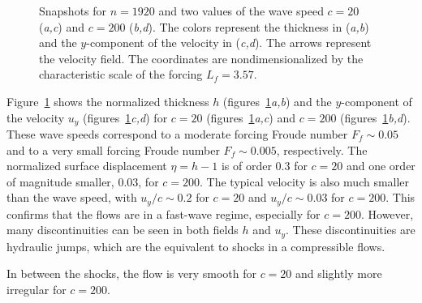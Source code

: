 \begin{figure}
\setlength{\halfwidth}{2.72in}
\caption{
Snapshots for $n = 1920$ and two values of the wave speed 
$c= 20$ (\textit{a,c}) and $c= 200$ (\textit{b,d}).
The colors represent the thickness in (\textit{a,b}) and
the $y$-component of the velocity in (\textit{c,d}).
The arrows represent the velocity field.
%
The coordinates are nondimensionalized by the characteristic scale of
the forcing $L_f = 3.57$.  }
\label{fig_phys}
\end{figure}

Figure~\ref{fig_phys} shows %
the normalized thickness $h$ %
(figures~\ref{fig_phys}\textit{a,b}) %
and the $y$-component of the velocity $u_y$ %
(figures~\ref{fig_phys}\textit{c,d}) %
for $c = 20$ (figures~\ref{fig_phys}\textit{a,c}) and %
$c = 200$ (figures~\ref{fig_phys}\textit{b,d}).
%
These wave speeds correspond %
to a moderate forcing Froude number $F_f \sim 0.05$ and %
to a very small forcing Froude number $F_f \sim 0.005$, respectively.
The normalized surface displacement $\eta = h - 1$ is of order 0.3 for
$c = 20$ and one order of magnitude smaller, 0.03, for $c = 200$.
%
The typical velocity is also much smaller than the wave speed, %
with $u_y/c \sim 0.2$ for $c = 20$ %
and $u_y/c \sim 0.03$ for $c = 200$. %
This confirms that the flows are in a fast-wave regime, especially for
$c = 200$.
%
However, many discontinuities can be seen in both fields $h$ and
$u_y$.  These discontinuities are hydraulic jumps, which are the
equivalent to shocks in a compressible flows.
%

\nocite{Baines1998}

%
In between the shocks, the flow is very smooth for $c=20$ and slightly
more irregular for $c = 200$.

